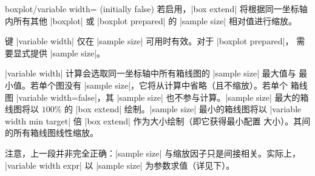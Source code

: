 \begin{pgfplotskey}{boxplot/variable width= (initially false)}
    若启用，|box extend| 将根据同一坐标轴内所有其他 |boxplot| 或
    |boxplot prepared| 的 |sample size| 相对值进行缩放。

    键 |variable width| 仅在 |sample size| 可用时有效。对于 |boxplot prepared|，
    需要显式提供 |sample size|。
\begin{codeexample}[]
\end{codeexample}

    |variable width| 计算会选取同一坐标轴中所有箱线图的 |sample size| 最大值与
    最小值。若单个图没有 |sample size|，它将从计算中省略（且不缩放）。若单个
    箱线图 |variable width=false|，其 |sample size| 也不参与计算。|sample size|
    最大的箱线图将以 $100\%$ 的 |box extend| 绘制。|sample size| 最小的箱线图将以
    |variable width min target| 倍 |box extend| 作为大小绘制（即它获得最小配置
    大小）。其间的所有箱线图线性缩放。

    注意，上一段并非完全正确：|sample size| 与缩放因子只是间接相关。实际上，
    |variable width expr| 以 |sample size| 为参数求值（详见下）。
\end{pgfplotskey}

